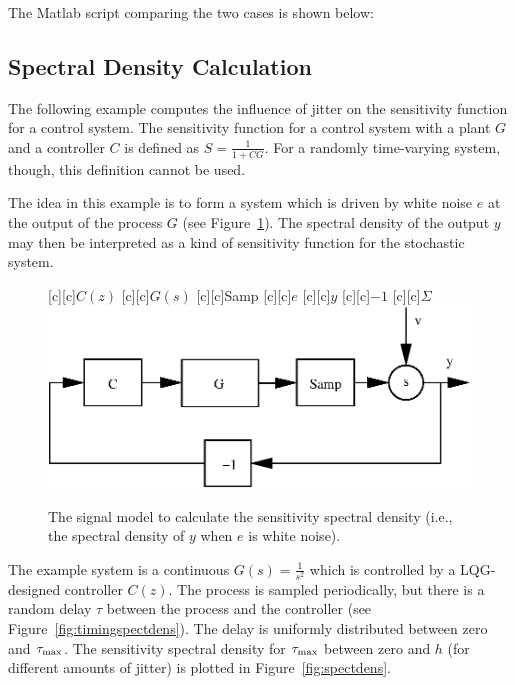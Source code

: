 \documentclass[final,twoside]{rapport}  %
\begin{document}
The Matlab script comparing the two cases is shown below:
\begin{small}

\end{small}


\subsection{Spectral Density Calculation}
The following example computes the influence of jitter on the
sensitivity function for a control system. The sensitivity function
for a control system with a plant $G$ and a controller $C$ is defined
as $S = \frac{1}{1+CG}$. For a randomly time-varying system, though,
this definition cannot be used.

The idea in this example is to form a
system which is driven by white noise $e$ at the output of the process
$G$ (see Figure~\ref{fig:blockspectdens}). The spectral density of the
output $y$ may then be interpreted as a kind of sensitivity function for the
stochastic system.

\begin{figure}
  \center
  [c][c]{$C(z)$}
  [c][c]{$G(s)$}
  [c][c]{\small Samp}
  [c][c]{$e$}
  [c][c]{$y$}
  [c][c]{$-1$}
  [c][c]{$\Sigma$}
  \includegraphics[width=0.6\hsize]{blockspectdens.eps}
  \caption{The signal model to calculate the sensitivity spectral
    density (i.e., the spectral density of $y$ when $e$ is
    white noise).}
  \label{fig:blockspectdens}
\end{figure}

The example system is a continuous $G(s) = \frac{1}{s^2}$ which is
controlled by a LQG-designed controller $C(z)$. The process is sampled
periodically, but there is a random delay $\tau$ between the process and the
controller (see Figure~\ref{fig:timingspectdens}).  The delay is
uniformly distributed between zero and $\tau_{\rm max}$. The
sensitivity spectral density for $\tau_{\rm max}$ between zero and $h$
(for different amounts of jitter) is plotted in
Figure~\ref{fig:spectdens}.
\end{document}
